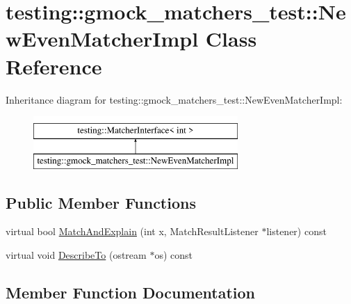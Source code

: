 \hypertarget{classtesting_1_1gmock__matchers__test_1_1NewEvenMatcherImpl}{}\section{testing\+::gmock\+\_\+matchers\+\_\+test\+::New\+Even\+Matcher\+Impl Class Reference}
\label{classtesting_1_1gmock__matchers__test_1_1NewEvenMatcherImpl}
Inheritance diagram for testing\+::gmock\+\_\+matchers\+\_\+test\+::New\+Even\+Matcher\+Impl\+:\begin{figure}[H]
\begin{center}
\leavevmode
\includegraphics[height=2.000000cm]{classtesting_1_1gmock__matchers__test_1_1NewEvenMatcherImpl}
\end{center}
\end{figure}
\subsection*{Public Member Functions}
\begin{DoxyCompactItemize}
\item 
virtual bool \mbox{\hyperlink{classtesting_1_1gmock__matchers__test_1_1NewEvenMatcherImpl_a56819af55d88569fdfaa51b937f76337}{Match\+And\+Explain}} (int x, Match\+Result\+Listener $\ast$listener) const
\item 
virtual void \mbox{\hyperlink{classtesting_1_1gmock__matchers__test_1_1NewEvenMatcherImpl_aece368c865501da4b30620d06a2690cd}{Describe\+To}} (ostream $\ast$os) const
\end{DoxyCompactItemize}


\subsection{Member Function Documentation}
\mbox{\label{classtesting_1_1gmock__matchers__test_1_1NewEvenMatcherImpl_aece368c865501da4b30620d06a2690cd}} 
